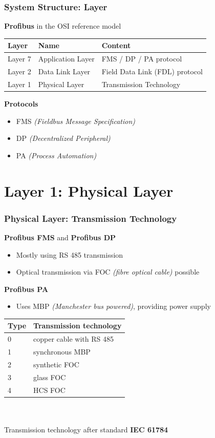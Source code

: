 \documentclass{beamer}
\begin{document}
\begin{frame}
  \frametitle{System Structure: Layer}
  \textbf{Profibus} in the OSI reference model~\cite{profibusmanual}
  \begin{center}
    \footnotesize
    \begin{tabular}[h]{l|l|l}
      \textbf{Layer}  & \textbf{Name}     & \textbf{Content} \\
      \hline
      Layer 7         & Application Layer & FMS / DP / PA protocol \\
      Layer 2         & Data Link Layer   & Field Data Link (FDL) protocol \\
      Layer 1         & Physical Layer    & Transmission Technology
    \end{tabular}
    \normalsize
  \end{center}
  \textbf{Protocols}
  \begin{itemize}
    \item FMS \textit{(Fieldbus Message Specification)}
    \item DP \textit{(Decentralized Peripheral)}
    \item PA \textit{(Process Automation)}
  \end{itemize}
\end{frame}

\section{Layer 1: Physical Layer}
\begin{frame}
  \frametitle{Physical Layer: Transmission Technology}
  \textbf{Profibus FMS} and \textbf{Profibus DP}
  \begin{itemize}
    \item Mostly using RS 485 transmission
    \item Optical transmission via FOC \textit{(fibre optical cable)} possible
  \end{itemize}
  \textbf{Profibus PA}
  \begin{itemize}
    \item Uses MBP \textit{(Manchester bus powered)}, providing power supply
  \end{itemize}
  \vspace{-15pt}
  \center
  \footnotesize
  \begin{tabular}[h]{l|l}
    \textbf{Type} & \textbf{Transmission technology} \\
    \hline
    0             & copper cable with RS 485 \\
    1             & synchronous MBP \\
    2             & synthetic FOC \\
    3             & glass FOC \\
    4             & HCS FOC
  \end{tabular} \\
  \hfill \\
  \normalsize
Transmission technology after standard \textbf{IEC 61784}~\cite{profibusmanual}
\end{frame}
\end{document}
